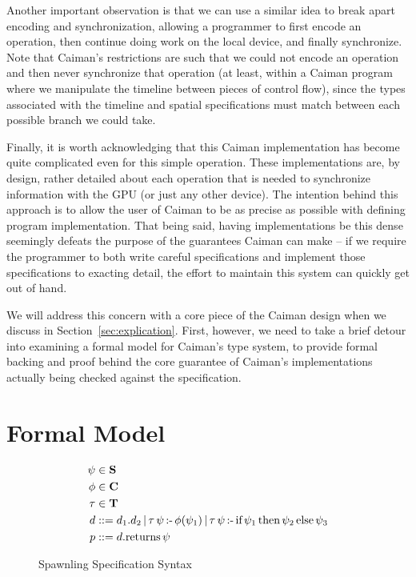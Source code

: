 Another important observation is that we can use a similar idea to break apart encoding and synchronization, allowing a programmer to first encode an operation, then continue doing work on the local device, and finally synchronize.  Note that Caiman's restrictions are such that we could not encode an operation and then never synchronize that operation (at least, within a Caiman program where we manipulate the timeline between pieces of control flow), since the types associated with the timeline and spatial specifications must match between each possible branch we could take.

Finally, it is worth acknowledging that this Caiman implementation has become quite complicated even for this simple operation.  These implementations are, by design, rather detailed about each operation that is needed to synchronize information with the GPU (or just any other device).  The intention behind this approach is to allow the user of Caiman to be as precise as possible with defining program implementation.  That being said, having implementations be this dense seemingly defeats the purpose of the guarantees Caiman can make -- if we require the programmer to both write careful specifications and implement those specifications to exacting detail, the effort to maintain this system can quickly get out of hand.

We will address this concern with a core piece of the Caiman design when we discuss in Section~\ref{sec:explication}.  First, however, we need to take a brief detour into examining a formal model for Caiman's type system, to provide formal backing and proof behind the core guarantee of Caiman's implementations actually being checked against the specification.

\section{Formal Model}
\label{sec:formal}

\begin{figure}
\begin{align*}
	\psi &\in \textbf{S}\\
	\phi &\in \textbf{C}\\
	\tau &\in \textbf{T} \\
    d &\mathrel{::=} d_1.d_2 \,|\,
        \tau\,\psi\,\textrm{:-}\, \phi(\psi_1) \,|\,
        \tau\,\psi\,\textrm{:-}\, \textrm{if}\, \psi_1 \,\textrm{then}\, \psi_2 \,\textrm{else}\, \psi_3 
        \\
    p &\mathrel{::=} d.\textrm{returns}\, \psi
\end{align*}
\caption{Spawnling Specification Syntax}
\label{fig:spawnspecsyntax}
\end{figure}


